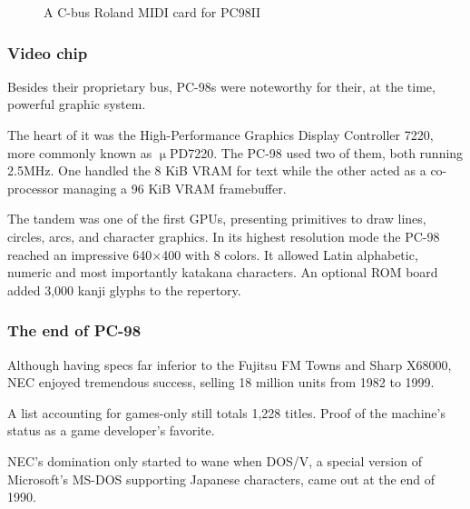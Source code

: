 \begin{figure}[H]

\caption*{A C-bus Roland MIDI card for PC98II}
\end{figure}



\subsubsection{Video chip}
Besides their proprietary bus, PC-98s were noteworthy for their, at the time, powerful graphic system.

The heart of it was the High-Performance Graphics Display Controller 7220, more commonly known as $\upmu$PD7220. The PC-98 used two of them, both running 2.5MHz. One handled the 8 KiB VRAM for text while the other acted as a co-processor managing a 96 KiB VRAM framebuffer.

The tandem was one of the first GPUs, presenting primitives to draw lines, circles, arcs, and character graphics. In its highest resolution mode the PC-98 reached an impressive 640×400 with 8 colors. It allowed Latin alphabetic, numeric and most importantly katakana characters. An optional ROM board added 3,000 kanji glyphs to the repertory.   

\subsubsection{The end of PC-98}

Although having specs far inferior to the Fujitsu FM Towns and Sharp X68000, NEC enjoyed tremendous success, selling 18 million units from 1982 to 1999.


A list accounting for games-only still totals 1,228 titles. Proof of the machine's status as a game developer's favorite.

NEC's domination only started to wane when DOS/V, a special version of Microsoft's MS-DOS supporting Japanese characters, came out at the end of 1990.





